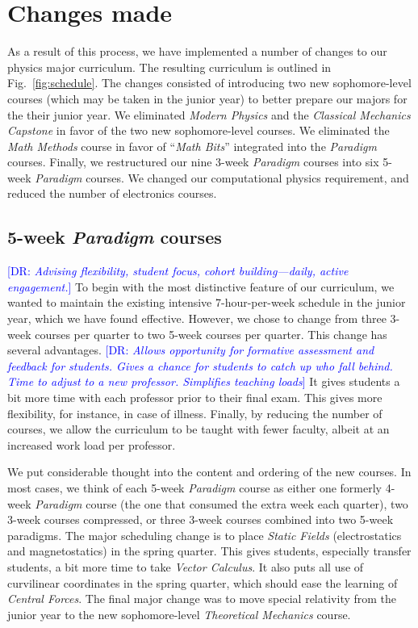 \documentclass[english,aps,pra,reprint,noshowpacs,superscriptaddress]{revtex4-1}
\newcommand\davidsays[1]{\textcolor{blue}{[\sc DR: {\em#1}]}}
\begin{document}
\section{Changes made}
As a result of this process, we have implemented a number of changes
to our physics major curriculum.  The resulting curriculum is outlined
in Fig.~\ref{fig:schedule}.  The changes consisted of introducing two
new sophomore-level courses (which may be taken in the junior year) to
better prepare our majors for the their junior year.  We eliminated \emph{Modern
Physics} and the \emph{Classical Mechanics Capstone} in favor of the two new
sophomore-level courses.  We eliminated the \emph{Math Methods} course in
favor of ``\emph{Math Bits}'' integrated into the \emph{Paradigm} courses.
Finally, we restructured our nine 3-week \emph{Paradigm} courses into six
5-week \emph{Paradigm} courses.  We changed our computational physics requirement,
and reduced the number of electronics courses.

\subsection{5-week \emph{Paradigm} courses}
\davidsays{Advising flexibility, student focus, cohort building---daily,
active engagement.}
To begin with the most distinctive feature of our curriculum, we
wanted to maintain the existing intensive 7-hour-per-week schedule in
the junior year, which we have found effective.  However, we chose to
change from three 3-week courses per quarter to two 5-week courses
per quarter.    This change has several advantages.  \davidsays{Allows opportunity for
formative assessment and feedback for students.  Gives a chance for students to
catch up who fall behind.  Time to adjust to a new professor.  Simplifies teaching
loads} It gives students
a bit more time with each professor prior to their final exam.  This
gives more flexibility, for instance, in case of illness.
Finally, by reducing the number of courses, we allow the curriculum
to be taught with fewer faculty, albeit at an increased work load per professor.

We put considerable thought into the content and ordering of the new
courses.  In most cases, we think of each 5-week \emph{Paradigm} course as either
one formerly 4-week \emph{Paradigm} course (the one that consumed the extra week
each quarter), two 3-week courses compressed, or three 3-week courses combined
into two 5-week paradigms.  The major
scheduling change is to place \emph{Static Fields} (electrostatics and
magnetostatics) in the spring quarter.  
This gives students, especially transfer students, 
a bit more time to take \emph{Vector Calculus}.  It also puts all use of
curvilinear coordinates in the spring quarter, which should ease the
learning of \emph{Central Forces}.  The final major change was to move
special relativity from the junior year to the new sophomore-level
\emph{Theoretical Mechanics} course.
\end{document}

